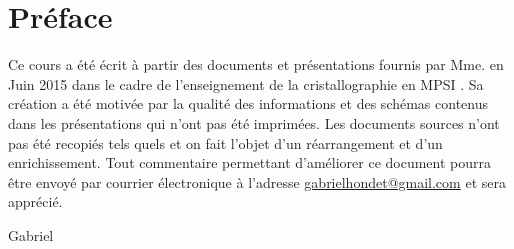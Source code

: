 \chapter{Préface}
Ce cours a été écrit à partir des documents et présentations fournis par Mme.
en Juin 2015 dans le cadre de l’enseignement de la cristallographie en MPSI . Sa création
a été motivée par la qualité des informations et des schémas contenus dans les
présentations qui n’ont pas été imprimées. Les documents sources n’ont pas été recopiés
tels quels et on fait l’objet d’un réarrangement et d’un enrichissement. Tout
commentaire permettant d’améliorer ce document pourra être envoyé par courrier électronique
à l’adresse \url{gabrielhondet@gmail.com} et sera apprécié.

\hfill Gabriel 
